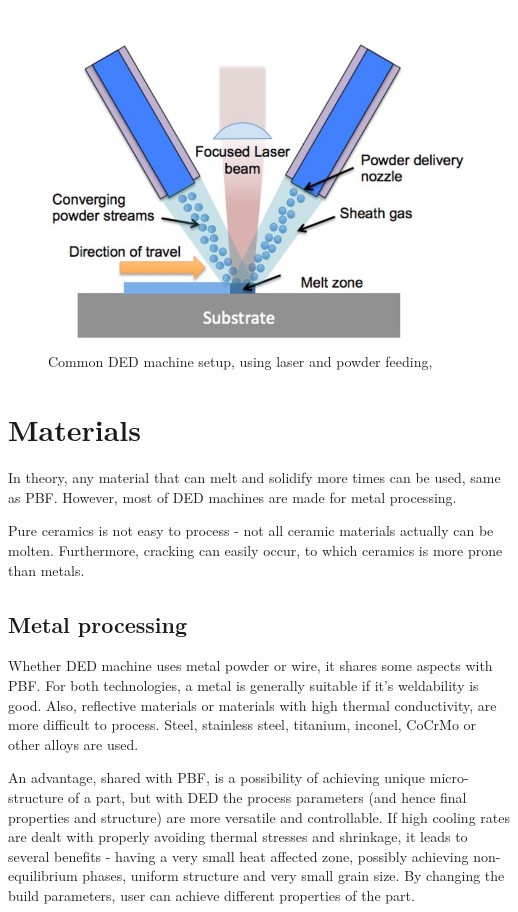 \documentclass[a4paper, 11pt, reqno]{report}
\begin{document}
\begin{figure}[h]
	\centering
	\includegraphics[scale=0.7]{DED3dprinting}
	\caption{Common DED machine setup, using laser and powder feeding, \cite{3dprinting}}
\end{figure}

\section{Materials}

In theory, any material that can melt and solidify more times can be used, same as PBF. However, most of DED machines are made for metal processing.

	Pure ceramics is not easy to process - not all ceramic materials actually can be molten. Furthermore, cracking can easily occur, to which ceramics is more prone than metals.

\subsection{Metal processing}
Whether DED machine uses metal powder or wire, it shares some aspects with PBF. For both technologies, a metal is generally suitable if it's weldability is good. Also, reflective materials or materials with high thermal conductivity, are more difficult to process. Steel, stainless steel, titanium, inconel, CoCrMo or other alloys are used.

	An advantage, shared with PBF, is a possibility of achieving unique micro-structure of a part, but with DED the process parameters (and hence final properties and structure) are more versatile and controllable. If high cooling rates are dealt with properly avoiding thermal stresses and shrinkage, it leads to several benefits - having a very small heat affected zone, possibly achieving non-equilibrium phases, uniform structure and very small grain size. By changing the build parameters, user can achieve different properties of the part.
\end{document}
